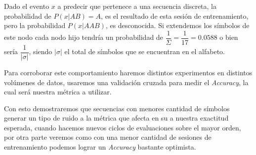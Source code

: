 Dado el evento $x$  a predecir que pertenece a una secuencia discreta, la probabilidad de $P( x| AB  ) = A $, es el resultado de esta sesión de entrenamiento, pero la probabilidad $P(x | AAB) $, es desconocida.  Si extendemos los símbolos de este nodo cada nodo hijo tendría un probabilidad de $ \dfrac{1}{\Sigma} = \dfrac{1}{17} = 0.0588 $ o bien sería  $\dfrac{1}{ |\sigma| }$, siendo $|\sigma|$ el total de símbolos que se encuentran en el alfabeto. 

Para corroborar este comportamiento haremos distintos experimentos en distintos volúmenes de datos, usaremos una validación cruzada para medir el \emph{Accuracy}, la cual será nuestra métrica a utilizar.

Con esto demostraremos que secuencias con menores cantidad de símbolos generar un tipo de ruido a la métrica  que afecta en su a nuestra exactitud esperada, cuando hacemos nuevos ciclos de evaluaciones sobre el mayor orden, por otra parte veremos como con una menor cantidad de sesiones de entrenamiento podemos lograr un \emph{Accuracy} bastante optimista.



